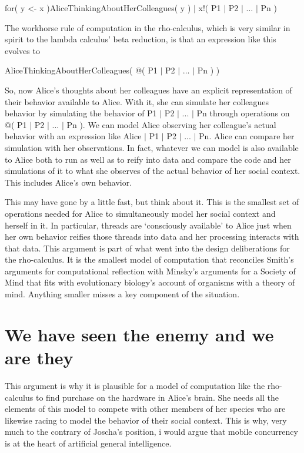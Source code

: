 \documentclass[runningheads]{llncs}
\begin{document}
\vspace{1\baselineskip}
for( y <- x )AliceThinkingAboutHerColleagues( y ) $\vert$ x!( P1 $\vert$ P2 $\vert$ $\ldots$ $\vert$ Pn )

\vspace{1\baselineskip}
The workhorse rule of computation in the rho-calculus, which is very similar in spirit to the lambda calculus’ beta reduction, is that an expression like this evolves to

\vspace{1\baselineskip}
AliceThinkingAboutHerColleagues( @( P1 $\vert$ P2 $\vert$ $\ldots$ $\vert$ Pn ) )

\vspace{1\baselineskip}
So, now Alice’s thoughts about her colleagues have an explicit representation of their behavior available to Alice. With it, she can simulate her colleagues behavior by simulating the behavior of P1 $\vert$ P2 $\vert$ ... $\vert$ Pn through operations on @( P1 $\vert$ P2 $\vert$ ... $\vert$ Pn ). We can model Alice observing her colleague’s actual behavior with an expression like Alice $\vert$ P1 $\vert$ P2 $\vert$ ... $\vert$ Pn. Alice can compare her simulation with her observations. In fact, whatever we can model is also available to Alice both to run as well as to reify into data and compare the code and her simulations of it to what she observes of the actual behavior of her social context. This includes Alice’s own behavior. 

\vspace{1\baselineskip}
This may have gone by a little fast, but think about it. This is the smallest set of operations needed for Alice to simultaneously model her social context and herself in it. In particular, threads are ‘consciously available’ to Alice just when her own behavior reifies those threads into data and her processing interacts with that data. This argument is part of what went into the design deliberations for the rho-calculus. It is the smallest model of computation that reconciles Smith’s arguments for computational reflection with Minsky’s arguments for a Society of Mind that fits with evolutionary biology’s account of organisms with a theory of mind. Anything smaller misses a key component of the situation.

\vspace{1\baselineskip}
\section{We have seen the enemy and we are they}

This argument is why it is plausible for a model of computation like the rho-calculus to find purchase on the hardware in Alice’s brain. She needs all the elements of this model to compete with other members of her species who are likewise racing to model the behavior of their social context. This is why, very much to the contrary of Joscha’s position, i would argue that mobile concurrency is at the heart of artificial general intelligence.
\end{document}
